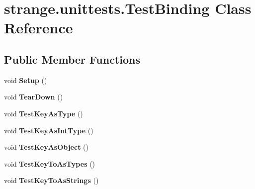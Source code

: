 \hypertarget{classstrange_1_1unittests_1_1_test_binding}{\section{strange.\-unittests.\-Test\-Binding Class Reference}
\label{classstrange_1_1unittests_1_1_test_binding}
}
\subsection*{Public Member Functions}
\begin{DoxyCompactItemize}
\item 
\hypertarget{classstrange_1_1unittests_1_1_test_binding_a586c34fcdf0f9c77a0e5db36c73b4561}{void {\bfseries Setup} ()}\label{classstrange_1_1unittests_1_1_test_binding_a586c34fcdf0f9c77a0e5db36c73b4561}

\item 
\hypertarget{classstrange_1_1unittests_1_1_test_binding_a56f4ad6389cf90f2c641a7abe37c42d5}{void {\bfseries Tear\-Down} ()}\label{classstrange_1_1unittests_1_1_test_binding_a56f4ad6389cf90f2c641a7abe37c42d5}

\item 
\hypertarget{classstrange_1_1unittests_1_1_test_binding_a5a1b3a48c688d47cece6db2c7b939055}{void {\bfseries Test\-Key\-As\-Type} ()}\label{classstrange_1_1unittests_1_1_test_binding_a5a1b3a48c688d47cece6db2c7b939055}

\item 
\hypertarget{classstrange_1_1unittests_1_1_test_binding_aa9d53469ed7a65d2dcb0c0182d95e4e0}{void {\bfseries Test\-Key\-As\-Int\-Type} ()}\label{classstrange_1_1unittests_1_1_test_binding_aa9d53469ed7a65d2dcb0c0182d95e4e0}

\item 
\hypertarget{classstrange_1_1unittests_1_1_test_binding_a80d1cf5de4f1db004353c8fc4fb17e84}{void {\bfseries Test\-Key\-As\-Object} ()}\label{classstrange_1_1unittests_1_1_test_binding_a80d1cf5de4f1db004353c8fc4fb17e84}

\item 
\hypertarget{classstrange_1_1unittests_1_1_test_binding_ab217a7100e1aab9a97b55e2a0aa04250}{void {\bfseries Test\-Key\-To\-As\-Types} ()}\label{classstrange_1_1unittests_1_1_test_binding_ab217a7100e1aab9a97b55e2a0aa04250}

\item 
\hypertarget{classstrange_1_1unittests_1_1_test_binding_a8e2e1d8c648c364676ee083185402d44}{void {\bfseries Test\-Key\-To\-As\-Strings} ()}\label{classstrange_1_1unittests_1_1_test_binding_a8e2e1d8c648c364676ee083185402d44}


\end{DoxyCompactItemize}
